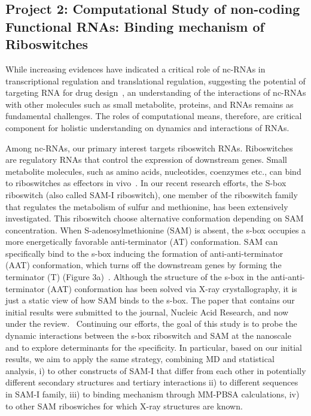 \documentclass[a4paper,10pt]{article}
\begin{document}
\subsection*{Project 2: Computational Study of non-coding Functional RNAs: Binding mechanism of Riboswitches}


While increasing evidences have indicated a critical role of nc-RNAs in transcriptional regulation and
translational regulation, suggesting the potential of targeting RNA for drug
design~\cite{foloppe}, an understanding of the interactions of nc-RNAs with other molecules such as small metabolite, proteins, and RNAs remains as fundamental challenges.  The roles of computational means, therefore, are critical component for holistic understanding on dynamics and interactions of RNAs.  

Among nc-RNAs, our primary interest targets riboswitch RNAs. Riboswitches are regulatory RNAs that control the expression of downstream genes. Small metabolite 
molecules, such as amino acids, nucleotides, coenzymes etc., can bind to riboswitches as effectors in  vivo~\cite{mandal}. 
In our recent research efforts, the S-box riboswitch (also called SAM-I riboswitch), one member of the riboswitch family that
regulates the metabolism of sulfur and methionine, has been extensively investigated.  This riboswitch choose alternative conformation depending on SAM concentration.  When S-adenosylmethionine (SAM) is absent, the
s-box occupies a more energetically favorable anti-terminator (AT) conformation. SAM can
specifically bind to the s-box inducing the formation of anti-anti-terminator (AAT) conformation,
which turns off the downstream genes by forming the terminator (T) (Figure 3a)~\cite{brooke}. Although the 
structure of the s-box in the anti-anti-terminator (AAT) conformation has been solved via X-ray 
crystallography, it is just a static view of how SAM binds to the s-box.  The paper that contains our initial results were submitted to the journal, Nucleic Acid Research, and now under the review.~\cite{SAM-I-NAR2009}  Continuing our efforts, the goal of this study is to probe 
the dynamic interactions between the s-box riboswitch and SAM at the nanoscale and to explore 
determinants for the specificity. In particular, based on our initial results, we aim to apply the same strategy, combining MD and statistical analysis, i) to other constructs of SAM-I that differ from each other in potentially different secondary structures and tertiary interactions ii) to different sequences in SAM-I family, iii) to binding mechanism through MM-PBSA calculations, iv) to other SAM riboswiches for which X-ray structures are known.   
\end{document}
